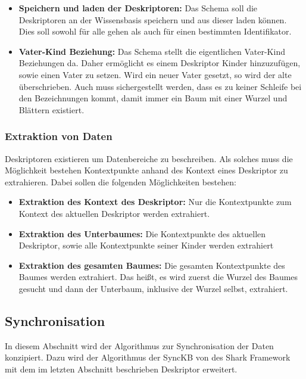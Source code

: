 \documentclass[a4paper]{article}
\begin{document}
	\begin{itemize}
		\item \textbf{Speichern und laden der Deskriptoren:} Das Schema soll die
		 Deskriptoren an der Wissensbasis speichern und aus dieser laden können.
		 Dies soll sowohl für alle gehen als auch für einen bestimmten
		 Identifikator.
		\item \textbf{Vater-Kind Beziehung:} Das Schema stellt die eigentlichen
		Vater-Kind Beziehungen da. Daher ermöglicht es einem Deskriptor Kinder
		hinzuzufügen, sowie einen Vater zu setzen. Wird ein neuer Vater gesetzt,
		so wird der alte überschrieben. Auch muss sichergestellt werden, dass
		es zu keiner Schleife bei den Bezeichnungen kommt, damit immer ein Baum
		mit einer Wurzel und Blättern existiert.
	\end{itemize}
	
	\subsubsection{Extraktion von Daten}
	\label{sec:extraction}
	
	Deskriptoren existieren um Datenbereiche zu beschreiben. Als solches 
	muss die Möglichkeit bestehen Kontextpunkte anhand des Kontext eines Deskriptor
	zu extrahieren. Dabei sollen die folgenden Möglichkeiten bestehen:
	
	\begin{itemize}
		\item \textbf{Extraktion des Kontext des Deskriptor:} Nur die Kontextpunkte
		zum Kontext des aktuellen Deskriptor werden extrahiert.
		\item \textbf{Extraktion des Unterbaumes:} Die Kontextpunkte des aktuellen
		 Deskriptor, sowie alle Kontextpunkte seiner Kinder werden extrahiert
		\item \textbf{Extraktion des gesamten Baumes:} Die gesamten Kontextpunkte
		des Baumes werden extrahiert. Das heißt, es wird zuerst die Wurzel des
		Baumes gesucht und dann der Unterbaum, inklusive der Wurzel selbst,
		extrahiert.
	\end{itemize}
	
	\subsection{Synchronisation}
	
	In diesem Abschnitt wird der Algorithmus zur Synchronisation der Daten
	konzipiert. Dazu wird der Algorithmus der SyncKB von des Shark Framework 
	mit dem im letzten Abschnitt beschrieben Deskriptor erweitert.
	
\end{document}
